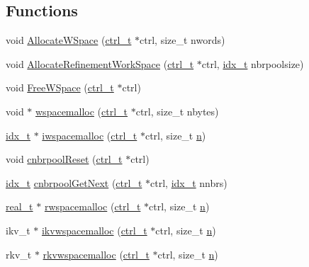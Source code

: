 \subsection*{Functions}
\begin{DoxyCompactItemize}
\item 
void \hyperlink{a00984_aaedfa12582d61baba3729f8204d9fddb}{Allocate\+W\+Space} (\hyperlink{a00742}{ctrl\+\_\+t} $\ast$ctrl, size\+\_\+t nwords)
\item 
void \hyperlink{a00984_a2b337cc68be55b7e8b6d2218fcea855d}{Allocate\+Refinement\+Work\+Space} (\hyperlink{a00742}{ctrl\+\_\+t} $\ast$ctrl, \hyperlink{a00876_aaa5262be3e700770163401acb0150f52}{idx\+\_\+t} nbrpoolsize)
\item 
void \hyperlink{a00984_a184692abde6fa16ba8d429796e888cd9}{Free\+W\+Space} (\hyperlink{a00742}{ctrl\+\_\+t} $\ast$ctrl)
\item 
void $\ast$ \hyperlink{a00984_a555f2ae3f4e5561c9b1ef592bf0f8476}{wspacemalloc} (\hyperlink{a00742}{ctrl\+\_\+t} $\ast$ctrl, size\+\_\+t nbytes)
\item 
\hyperlink{a00876_aaa5262be3e700770163401acb0150f52}{idx\+\_\+t} $\ast$ \hyperlink{a00984_ac838f4c6cb4f30b2888cbea0003ffc61}{iwspacemalloc} (\hyperlink{a00742}{ctrl\+\_\+t} $\ast$ctrl, size\+\_\+t \hyperlink{a00623_a781a04ab095280f838ff3eb0e51312e0}{n})
\item 
void \hyperlink{a00984_ab24df9968589b0cfabb8f1a8b4661d0d}{cnbrpool\+Reset} (\hyperlink{a00742}{ctrl\+\_\+t} $\ast$ctrl)
\item 
\hyperlink{a00876_aaa5262be3e700770163401acb0150f52}{idx\+\_\+t} \hyperlink{a00984_a5c7982f300512c943ce53a0531529ae8}{cnbrpool\+Get\+Next} (\hyperlink{a00742}{ctrl\+\_\+t} $\ast$ctrl, \hyperlink{a00876_aaa5262be3e700770163401acb0150f52}{idx\+\_\+t} nnbrs)
\item 
\hyperlink{a00876_a1924a4f6907cc3833213aba1f07fcbe9}{real\+\_\+t} $\ast$ \hyperlink{a00984_ad1c3f444b6873f0bfdb82e1bb98372d5}{rwspacemalloc} (\hyperlink{a00742}{ctrl\+\_\+t} $\ast$ctrl, size\+\_\+t \hyperlink{a00623_a781a04ab095280f838ff3eb0e51312e0}{n})
\item 
ikv\+\_\+t $\ast$ \hyperlink{a00984_accf7db8ecb7288f18eaf02d58cbb1244}{ikvwspacemalloc} (\hyperlink{a00742}{ctrl\+\_\+t} $\ast$ctrl, size\+\_\+t \hyperlink{a00623_a781a04ab095280f838ff3eb0e51312e0}{n})
\item 
rkv\+\_\+t $\ast$ \hyperlink{a00984_adfa1dc5e723d63f32672d993e3f52e4f}{rkvwspacemalloc} (\hyperlink{a00742}{ctrl\+\_\+t} $\ast$ctrl, size\+\_\+t \hyperlink{a00623_a781a04ab095280f838ff3eb0e51312e0}{n})
\end{DoxyCompactItemize}


